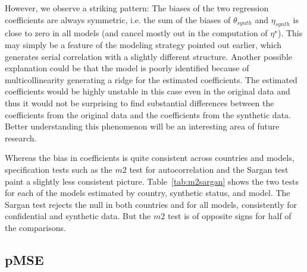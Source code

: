 However, we observe a striking pattern: The biases of the two regression coefficients are always symmetric, i.e. the sum of the biases of $\theta_{synth}$ and $\eta_{synth}$ is close to zero in all models (and cancel mostly out in the computation of $\eta^\star$). 
This may simply be a feature of the modeling strategy pointed out earlier, which generates serial correlation with a slightly different structure. Another possible explanation could be that the model is poorly identified because of multicollinearity generating a ridge for the estimated coefficients. The estimated coefficients would be highly unstable in this case even in the original data and thus it would not be surprising to find substantial differences between the coefficients from the original data and the coefficients from the synthetic data. Better understanding this phenomenon will be an interesting area of future research.




Whereas the bias in coefficients is quite consistent across countries and models, specification tests such as  the $m2$ test for autocorrelation and the Sargan test paint a slightly less consistent picture. Table~\ref{tab:m2sargan} shows the two tests for each of the models estimated by country, synthetic status, and model. The Sargan test rejects the null in both countries and for all models, consistently for confidential and synthetic data. But the $m2$ test is of opposite signs for half of the comparisons. 



%



\subsection{pMSE}

